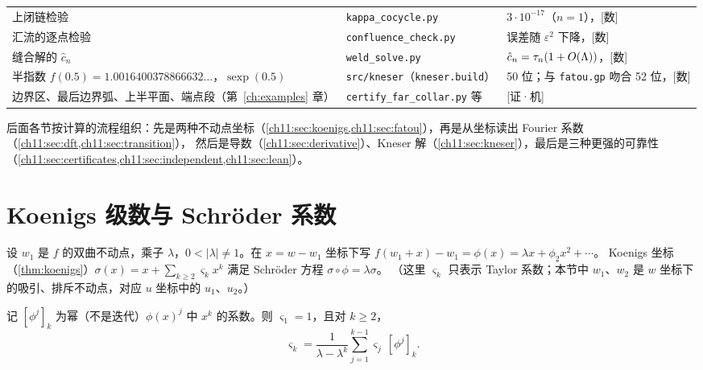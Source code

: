 \begin{table}[htbp]
\begin{tabular}{p{}p{}p{}}
\raggedright 上闭链检验 & \raggedright \texttt{kappa\_\allowbreak{}cocycle.py} & $3\cdot10^{-17}$（$n=1$），[数]\\
\raggedright 汇流的逐点检验 & \raggedright \texttt{confluence\_\allowbreak{}check.py} & 误差随 $\varepsilon^2$ 下降，[数]\\
\raggedright 缝合解的 $\hat c_n$ & \raggedright \texttt{weld\_\allowbreak{}solve.py} & $\hat c_n=\tau_n(1+O(\Lambda))$，[数]\\
\raggedright 半指数 $f(0.5)=1.0016400378866632\ldots$，$\operatorname{sexp}(0.5)$ & \raggedright \texttt{src/kneser}（\texttt{kneser.build}） & 50 位；与 \texttt{fatou.gp} 吻合 52 位，[数]\\
\raggedright 边界区、最后边界弧、上半平面、端点段（第~\ref{ch:examples} 章） & \raggedright \texttt{certify\_\allowbreak{}far\_\allowbreak{}collar.py} 等 & [证·机]\\
\bottomrule
\end{tabular}
\end{table}

后面各节按计算的流程组织：先是两种不动点坐标（\cref{ch11:sec:koenigs,ch11:sec:fatou}），再是从坐标读出 Fourier 系数（\cref{ch11:sec:dft,ch11:sec:transition}），
然后是导数（\cref{ch11:sec:derivative}）、Kneser 解（\cref{ch11:sec:kneser}），最后是三种更强的可靠性（\cref{ch11:sec:certificates,ch11:sec:independent,ch11:sec:lean}）。

\section{Koenigs 级数与 Schr\"oder 系数}\label{ch11:sec:koenigs}

设 $w_1$ 是 $f$ 的双曲不动点，乘子 $\lambda$，$0<|\lambda|\ne1$。在 $x=w-w_1$ 坐标下写 $f(w_1+x)-w_1=\phi(x)=\lambda x+\phi_2x^2+\cdots$。
Koenigs 坐标（\cref{thm:koenigs}）$\sigma(x)=x+\sum_{k\ge2}\varsigma_kx^k$ 满足 Schr\"oder 方程 $\sigma\circ\phi=\lambda\sigma$。
（这里 $\varsigma_k$ 只表示 Taylor 系数；本节中 $w_1$、$w_2$ 是 $w$ 坐标下的吸引、排斥不动点，对应 $u$ 坐标中的 $u_1$、$u_2$。）

\begin{proposition}\label{ch11:prop:schroeder}
记 $[\phi^j]_k$ 为幂（不是迭代）$\phi(x)^j$ 中 $x^k$ 的系数。则 $\varsigma_1=1$，且对 $k\ge2$，
\[
 \varsigma_k=\frac{1}{\lambda-\lambda^k}\sum_{j=1}^{k-1}\varsigma_j\,[\phi^j]_k .
\]
\end{proposition}

